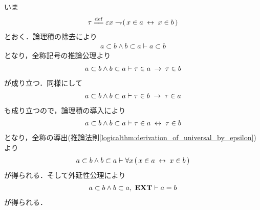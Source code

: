 	\begin{sketch}
		いま
		\begin{align}
			\tau \defeq \varepsilon x \negation (\, x \in a \lrarrow x \in b\, )
		\end{align}
		とおく．論理積の除去により
		\begin{align}
			a \subset b \wedge b \subset a \vdash a \subset b
		\end{align}
		となり，全称記号の推論公理より
		\begin{align}
			a \subset b \wedge b \subset a \vdash \tau \in a \hspace{0.25em}\rightarrow\hspace{0.25em} \tau \in b
		\end{align}
		が成り立つ．同様にして
		\begin{align}
			a \subset b \wedge b \subset a \vdash \tau \in b \hspace{0.25em}\rightarrow\hspace{0.25em} \tau \in a
		\end{align}
		も成り立つので，論理積の導入により
		\begin{align}
			a \subset b \wedge b \subset a \vdash \tau \in a \hspace{0.25em}\leftrightarrow\hspace{0.25em} \tau \in b
		\end{align}
		となり，全称の導出(推論法則\ref{logicalthm:derivation_of_universal_by_epsilon})より
		\begin{align}
			a \subset b \wedge b \subset a \vdash 
			\forall x\, (\, x \in a \hspace{0.25em}\leftrightarrow\hspace{0.25em} x \in b\, )
		\end{align}
		が得られる．そして外延性公理により
		\begin{align}
			a \subset b \wedge b \subset a,\ \mbox{{\bf EXT}} \vdash a = b 
		\end{align}
		が得られる．
		\QED
	\end{sketch}